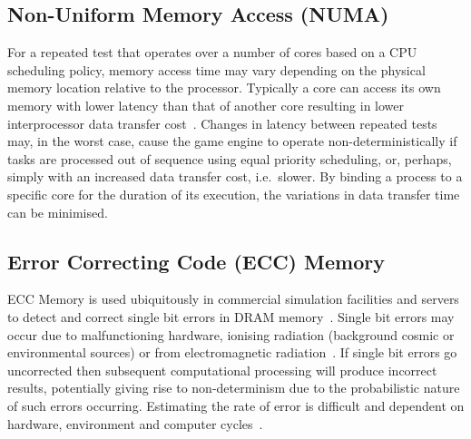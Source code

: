 





\DIFaddend \subsection{Non-Uniform Memory Access (NUMA)} \label{s:sources_numa}
For a repeated test that operates over a number of cores based on a CPU scheduling policy, memory access time may vary depending on the physical memory location relative to the processor. Typically a core can access its own memory with lower latency than that of another core resulting in lower interprocessor data transfer cost~\cite{nieplocha1996global}. 
%
Changes in latency between repeated tests may, in the worst case, cause the game engine to operate non-deterministically if tasks are processed out of sequence using equal priority scheduling, or, perhaps, simply with an increased data transfer cost, i.e.\ slower. 
%
By binding a process to a specific core for the duration of its execution, the variations in data transfer time can be minimised.






\subsection{Error Correcting Code (ECC) Memory}
ECC Memory is used ubiquitously in commercial simulation facilities and servers to detect and correct single bit errors in DRAM memory~\cite{Dell1997}. Single bit errors may occur due to malfunctioning hardware, ionising radiation (background cosmic or environmental sources) or from electromagnetic radiation~\cite{dodd2003basic}. If single bit errors go uncorrected then subsequent computational processing will produce incorrect results, potentially giving rise to non-determinism due to the probabilistic nature of such errors occurring. Estimating the rate of error is difficult and dependent on hardware, environment and computer cycles~\cite{mielke2008bit}.

